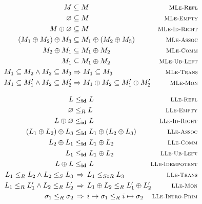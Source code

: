 \begin{figure}
    \noindent
    \vspace*{-17pt}
    \begin{align*}
        M &\subseteq M &
            \rulename{MLe-Refl} \\
        \varnothing &\subseteq M &
            \rulename{MLe-Empty} \\
        M \oplus \varnothing &\subseteq M &
            \rulename{MLe-Id-Right} \\
        (M_1 \oplus M_2) \oplus M_3 &\subseteq M_1 \oplus (M_2 \oplus M_3) &
            \rulename{MLe-Assoc} \\
        M_2 \oplus M_1 &\subseteq M_1 \oplus M_2 &
            \rulename{MLe-Comm} \\
        M_1 &\subseteq M_1 \oplus M_2 &
            \rulename{MLe-Ub-Left} \\
        M_1 \subseteq M_2 \wedge M_2 \subseteq M_3
            &\Rightarrow M_1 \subseteq M_3 &
            \rulename{MLe-Trans} \\
        M_1 \subseteq M_1' \wedge M_2 \subseteq M_2'
            &\Rightarrow M_1 \oplus M_2 \subseteq M_1' \oplus M_2'
            &\rulename{MLe-Mon}
    \end{align*}

    \vspace{1em}
    \noindent
    \vspace*{-17pt}
    \begin{align*}
        L &\lpath{\id} L &
            \rulename{LLe-Refl} \\
        \varnothing &\lpath{R} L &
            \rulename{LLe-Empty} \\
        L \oplus \varnothing &\lpath{\id} L &
            \rulename{LLe-Id-Right} \\
        (L_1 \oplus L_2) \oplus L_3 &\lpath{\id} L_1 \oplus (L_2 \oplus L_3) &
            \rulename{LLe-Assoc} \\
        L_2 \oplus L_1 &\lpath{\id} L_1 \oplus L_2 &
            \rulename{LLe-Comm} \\
        L_1 &\lpath{\id} L_1 \oplus L_2 &
            \rulename{LLe-Ub-Left} \\
        L \oplus L &\lpath{\id} L &
            \rulename{LLe-Idempotent} \\
        L_1 \lpath{R} L_2 \wedge L_2 \lpath{S} L_3 &\,\Rightarrow\,
            L_1 \lpath{S \circ R} L_3 &
            \rulename{LLe-Trans} \\
        L_1 \lpath{R} L_1' \wedge L_2 \lpath{R} L_2' &\,\Rightarrow\,
            L_1 \oplus L_2 \lpath{R} L_1' \oplus L_2' \hspace{-2em} &
            \rulename{LLe-Mon} \\
        \sigma_1 \lpath{R} \sigma_2 &\,\Rightarrow\,
            i \mapsto \sigma_1 \lpath{R} i \mapsto \sigma_2 &
            \rulename{LLe-Intro-Prim}
    \end{align*}


\end{figure}

